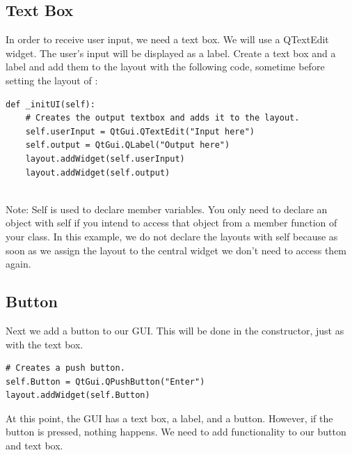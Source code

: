 \subsection*{Text Box}
In order to receive user input, we need a text box.  We will use a QTextEdit widget.  The user's input will be displayed as a label.  Create a text box and a label and add them to the layout with the following code, sometime before setting the layout of :
\begin{lstlisting}
def _initUI(self):
	# Creates the output textbox and adds it to the layout.
	self.userInput = QtGui.QTextEdit("Input here")
	self.output = QtGui.QLabel("Output here")
	layout.addWidget(self.userInput)
	layout.addWidget(self.output)
	
\end{lstlisting}


Note: Self is used to declare member variables.  You only need to declare an object with self if you intend to access that object from a member function of your class.  In this example, we do not declare the layouts with self because as soon as we assign the layout to the central widget we don't need to access them again.

\subsection*{Button}
Next we add a button to our GUI.  This will be done in the constructor, just as with the text box.
\begin{lstlisting}
# Creates a push button.
self.Button = QtGui.QPushButton("Enter")
layout.addWidget(self.Button)
\end{lstlisting}

At this point, the GUI has a text box, a label, and a button.  However, if the button is pressed, nothing happens.  We need to add functionality to our button and text box.

